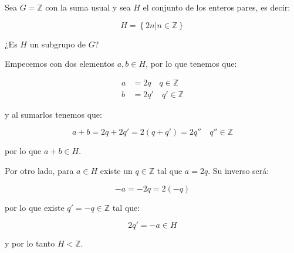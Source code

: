         \begin{ejemplo}
            Sea $G = \mathbb{Z}$ con la suma usual y sea $H$ el conjunto de los enteros pares, es decir:

            \begin{equation*}
                H = \left\{ 2n | n \in \mathbb{Z} \right\}
            \end{equation*}

            ¿Es $H$ un subgrupo de $G$?

            Empecemos con dos elementos $a, b \in H$, por lo que tenemos que:

            \begin{align*}
                a &= 2 q \quad q \in \mathbb{Z} \\
                b &= 2 q' \quad q' \in \mathbb{Z}
            \end{align*}

            y al sumarlos tenemos que:

            \begin{equation*}
                a + b = 2q + 2q' = 2(q + q') = 2q'' \quad q'' \in \mathbb{Z}
            \end{equation*}

            por lo que $a + b \in H$.

            Por otro lado, para $a \in H$ existe un $q \in \mathbb{Z}$ tal que $a = 2q$.
            Su inverso será:

            \begin{equation*}
                -a = -2 q = 2(-q)
            \end{equation*}

            por lo que existe $q' = -q \in \mathbb{Z}$ tal que:

            \begin{equation*}
                2 q' = -a \in H
            \end{equation*}

            y por lo tanto $H < \mathbb{Z}$.
        \end{ejemplo}

